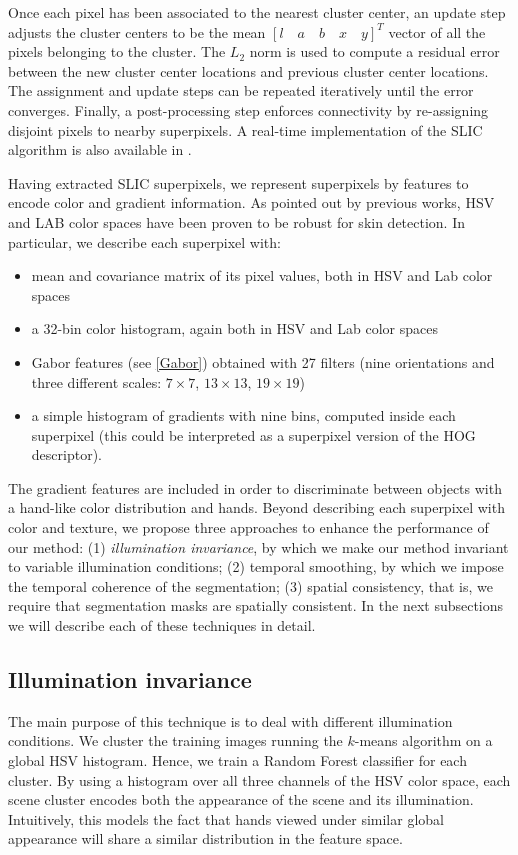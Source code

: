 Once each pixel has been associated to the nearest cluster center, an update step adjusts the cluster centers to be the mean
$[l \quad a \quad b \quad x \quad y]^T$ vector of all the pixels belonging to the cluster. The $L_2$ norm is used to compute a residual error  between
the new cluster center locations and previous cluster center locations. The assignment and update steps can be repeated
iteratively until the error converges. Finally, a post-processing step enforces connectivity by re-assigning disjoint pixels to
nearby superpixels. A real-time implementation of the SLIC algorithm is also available in \cite{YHRengSLIC}.

Having extracted SLIC superpixels, we represent superpixels by features to encode color and gradient information. As pointed out by previous works, HSV and LAB color spaces have been proven to be robust for skin detection. 
In particular, we describe each superpixel with:
\begin{itemize} 
\item mean and covariance matrix of its pixel values, both in HSV and Lab color spaces
\item a 32-bin color histogram, again both in HSV and Lab color spaces
\item Gabor features (see \ref{Gabor}) obtained with 27 filters (nine orientations and three different scales: $7 \times 7$, $13 \times 13$, $19 \times 19$) 
\item a simple histogram of gradients with nine bins, computed inside each superpixel (this could be interpreted as a superpixel version of the HOG descriptor). 
\end{itemize}

The gradient features are included in order to discriminate between objects with a hand-like color distribution and hands. Beyond describing each superpixel with color and texture, we propose three approaches to enhance the performance of our method: (1) \textit{illumination invariance}, by which we make our method invariant to variable illumination conditions; (2) temporal smoothing, by which we impose the temporal coherence of the segmentation; (3) spatial consistency, that is, we require that segmentation masks are spatially consistent. In the next subsections we will describe each of these techniques in detail.

\subsection{Illumination invariance}
The main purpose of this technique is to deal with different illumination conditions. We cluster the training images running the $k$-means algorithm on a global HSV histogram. Hence, we train a Random Forest classifier for each cluster. By using a histogram over all three channels of the HSV color space, each scene cluster encodes both the appearance of the scene and its illumination. Intuitively, this models the fact that hands viewed under similar global appearance will share a similar distribution in the feature space. 


